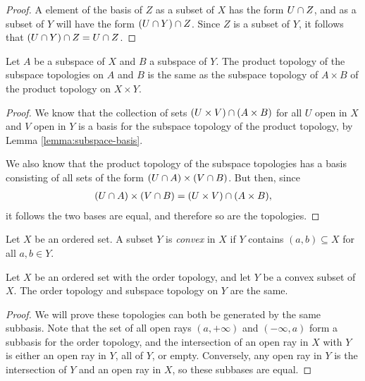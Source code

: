 \begin{proof}
    A element of the basis of $Z$ as a subset of $X$ has the form $U \cap Z$, and as a subset of $Y$ will have the form $(U \cap Y) \cap Z$. Since $Z$ is a subset of $Y$, it follows that $(U \cap Y) \cap Z = U \cap Z$.
\end{proof}

\begin{thm}
    Let $A$ be a subspace of $X$ and $B$ a subspace of $Y$. The product topology of the subspace topologies on $A$ and $B$ is the same as the subspace topology of $A \times B$ of the product topology on $X \times Y$.
\end{thm}

\begin{proof}
    We know that the collection of sets $(U \times V) \cap (A \times B)$ for all $U$ open in $X$ and $V$ open in $Y$ is a basis for the subspace topology of the product topology, by Lemma \ref{lemma:subspace-basis}.

    We also know that the product topology of the subspace topologies has a basis consisting of all sets of the form $(U \cap A) \times (V \cap B)$. But then, since
    \begin{align*}
        (U \cap A) \times (V \cap B) = (U \times V) \cap (A \times B),
    \end{align*}
    it follows the two bases are equal, and therefore so are the topologies.
\end{proof}

\begin{defn}
    Let $X$ be an ordered set. A subset $Y$ is \emph{convex} in $X$ if $Y$ contains $(a, b) \subseteq X$ for all $a, b \in Y$.
\end{defn}

\begin{thm}
    Let $X$ be an ordered set with the order topology, and let $Y$ be a convex subset of $X$. The order topology and subspace topology on $Y$ are the same.
\end{thm}

\begin{proof}
    We will prove these topologies can both be generated by the same subbasis. Note that the set of all open rays $(a, +\infty)$ and $(-\infty, a)$ form a subbasis for the order topology, and the intersection of an open ray in $X$ with $Y$ is either an open ray in $Y$, all of $Y$, or empty. Conversely, any open ray in $Y$ is the intersection of $Y$ and an open ray in $X$, so these subbases are equal.
\end{proof}

